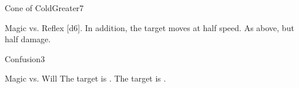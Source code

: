 \begin{spellsection}{Cone of Cold}{Greater}{7}
\begin{spellheader}
\end{spellheader}
\begin{spellcontent}
    \begin{spelltargetinginfo}
    \end{spelltargetinginfo}
    \begin{spelleffects}
        \begin{spellattack}{Magic vs. Reflex}
            \spellsuccess {}[d6]. In addition, the target moves at half speed.
            \spellfailure As above, but half damage.
        \end{spellattack}
    \end{spelleffects}
\end{spellcontent}
\begin{spellfooter}
\end{spellfooter}
\end{spellsection}

\begin{spellsection}{Confusion}{3}
\begin{spellheader}
\end{spellheader}
\begin{spellcontent}
    \begin{spelltargetinginfo}
    \end{spelltargetinginfo}
    \begin{spelleffects}
        \begin{spellattack}{Magic vs. Will}
            \spellsuccess The target is \disoriented.
            \spellcritical The target is \confused.
        \end{spellattack}
        \spelldur \durshort
    \end{spelleffects}
\end{spellcontent}
\begin{spellfooter}
\end{spellfooter}
\end{spellsection}

